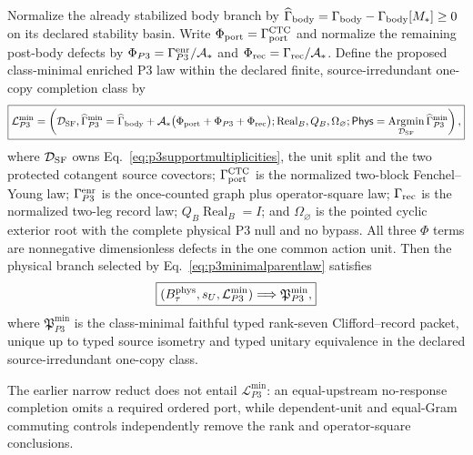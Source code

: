 \begin{theorem}
Normalize the already stabilized body branch by
$\widehat\Gamma_{\rm body}
=\Gamma_{\rm body}-\Gamma_{\rm body}[M_*]\geq0$ on its declared stability
basin.  Write $\Phi_{\rm port}=\Gamma_{\rm port}^{\rm CTC}$ and normalize the
remaining post-body defects by
$\Phi_{P3}=\Gamma_{P3}^{\rm enr}/\mathcal A_*$ and
$\Phi_{\rm rec}=\Gamma_{\rm rec}/\mathcal A_*$.  Define the proposed
class-minimal enriched P3 law within the declared finite,
source-irredundant one-copy completion class by
\begin{equation}
 \boxed{
 \mathcal L_{P3}^{\min}
 =\left(
 \mathcal D_{\rm SF},
 \widehat\Gamma_{P3}^{\min}
 =\widehat\Gamma_{\rm body}
 +\mathcal A_*\bigl(
   \Phi_{\rm port}+\Phi_{P3}+\Phi_{\rm rec}\bigr);
 \operatorname{Real}_B,Q_B,\Omega_\varnothing;
 \mathsf{Phys}=\operatorname*{Argmin}_{\mathcal D_{\rm SF}}
 \widehat\Gamma_{P3}^{\min}
 \right),}
 \label{eq:p3minimalparentlaw}
\end{equation}
where $\mathcal D_{\rm SF}$ owns
Eq.~\eqref{eq:p3supportmultiplicities}, the unit split and the two protected
cotangent source covectors;
$\Gamma_{\rm port}^{\rm CTC}$ is the normalized two-block
Fenchel--Young law; $\Gamma_{P3}^{\rm enr}$ is the once-counted graph plus
operator-square law; $\Gamma_{\rm rec}$ is the normalized two-leg record
law; $Q_B\operatorname{Real}_B=I$; and $\Omega_\varnothing$ is the pointed
cyclic exterior root with the complete physical P3 null and no bypass.  All
three $\Phi$ terms are nonnegative dimensionless defects in the one common
action unit.  Then the physical branch selected by
Eq.~\eqref{eq:p3minimalparentlaw} satisfies
\begin{equation}
 \boxed{
 (B_\tau^{\rm phys},s_U,\mathcal L_{P3}^{\min})
 \Longrightarrow \mathfrak P_{P3}^{\min},}
 \label{eq:p3minimalparentarrow}
\end{equation}
where $\mathfrak P_{P3}^{\min}$ is the class-minimal faithful typed rank-seven
Clifford--record packet, unique up to typed source isometry and typed unitary
equivalence in the declared source-irredundant one-copy class.

The earlier narrow reduct does not entail
$\mathcal L_{P3}^{\min}$: an equal-upstream no-response completion omits a
required ordered port, while dependent-unit and equal-Gram commuting controls
independently remove the rank and operator-square conclusions.
\end{theorem}

